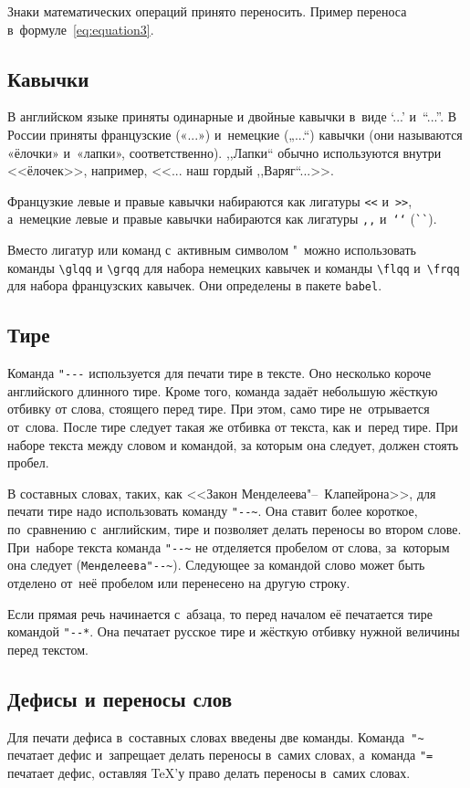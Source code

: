 Знаки математических операций принято переносить. Пример переноса
в~формуле~\eqref{eq:equation3}.

\subsection{Кавычки}
В английском языке приняты одинарные и двойные кавычки в~виде ‘...’ и~“...”.
В России приняты французские («...») и~немецкие („...“) кавычки (они называются
«ёлочки» и~«лапки», соответственно). ,,Лапки`` обычно используются внутри
<<ёлочек>>, например, <<... наш гордый ,,Варяг``...>>.

Французкие левые и правые кавычки набираются
как лигатуры \verb|<<| и~\verb|>>|, а~немецкие левые
и правые кавычки набираются как лигатуры \verb|,,| и~\verb|‘‘| (\verb|``|).

Вместо лигатур или команд с~активным символом "\ можно использовать команды
\verb|\glqq| и \verb|\grqq| для набора немецких кавычек и команды \verb|\flqq|
и~\verb|\frqq| для набора французских кавычек. Они определены в пакете
\verb|babel|.

\subsection{Тире}
Команда \verb|"---| используется для печати тире в тексте. Оно несколько короче
английского длинного тире. Кроме того, команда задаёт небольшую жёсткую отбивку
от слова, стоящего перед тире. При этом, само тире не~отрывается от~слова.
После тире следует такая же отбивка от текста, как и~перед тире. При наборе
текста между словом и командой, за которым она следует, должен стоять пробел.

В составных словах, таких, как <<Закон Менделеева"--~Клапейрона>>, для печати
тире надо использовать команду \verb|"--~|. Она ставит более короткое,
по~сравнению с~английским, тире и позволяет делать переносы во втором слове.
При~наборе текста команда \verb|"--~| не отделяется пробелом от слова,
за~которым она следует (\verb|Менделеева"--~|). Следующее за командой слово
может быть  отделено от~неё пробелом или перенесено на другую строку.

Если прямая речь начинается с~абзаца, то перед началом её печатается тире
командой \verb|"--*|. Она печатает русское тире и жёсткую отбивку нужной
величины перед текстом.

\subsection{Дефисы и переносы слов}
Для печати дефиса в~составных словах введены две команды. Команда~\verb|"~|
печатает дефис и~запрещает делать переносы в~самих словах, а~команда \verb|"=|
печатает дефис, оставляя \TeX ’у право делать переносы в~самих словах.

